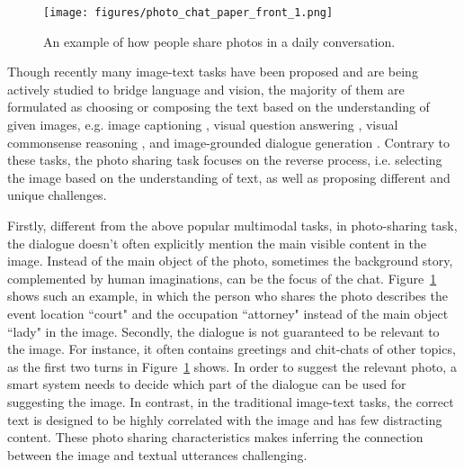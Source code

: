\documentclass[11pt,a4paper]{article}
\begin{document}
\begin{figure}[t]
  \centering
  \setlength{\abovecaptionskip}{-10pt}
  \texttt{[image: figures/photo\_chat\_paper\_front\_1.png]}
    \setlength{\belowcaptionskip}{-20pt}
  \caption{An example of how people share photos in a daily conversation.}
  \label{fig:front}
\end{figure}

Though recently many image-text tasks have been proposed and are being actively studied to bridge language and vision, the majority of them are formulated as choosing or composing the text based on the understanding of given images, e.g. image captioning \cite{anderson2018bottomup}, visual question answering \cite{vqa}, visual commonsense reasoning \cite{zellers2019vcr}, and image-grounded dialogue generation \cite{shuster-etal-2020-image}. Contrary to these tasks, the photo sharing task focuses on the reverse process, i.e. selecting the image based on the understanding of text, as well as proposing different and unique challenges. 

Firstly, different from the above popular multimodal tasks, in photo-sharing task, the dialogue doesn't often explicitly mention the main visible content in the image. Instead of the main object of the photo, sometimes the background story, complemented by human imaginations, can be the focus of the chat. Figure~\ref{fig:front} shows such an example, in which the person who shares the photo describes the event location ``court" and the occupation ``attorney" instead of the main object ``lady" in the image. Secondly, the dialogue is not guaranteed to be relevant to the image. For instance, it often contains greetings and chit-chats of other topics, as the first two turns in Figure~\ref{fig:front} shows. In order to suggest the relevant photo, a smart system needs to decide which part of the dialogue can be used for suggesting the image. In contrast, in the traditional image-text tasks, the correct text is designed to be highly correlated with the image and has few distracting content. These photo sharing characteristics makes inferring the connection between the image and textual utterances challenging. 
\end{document}
